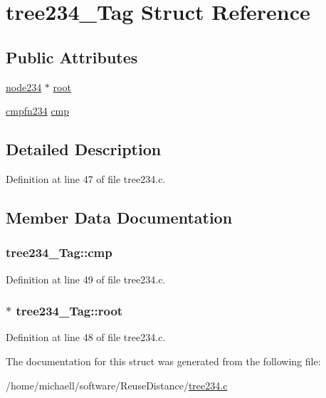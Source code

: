\hypertarget{structtree234___tag}{
\section{tree234\_\-Tag Struct Reference}
\label{structtree234___tag}
}
\subsection*{Public Attributes}
\begin{DoxyCompactItemize}
\item 
\hyperlink{structnode234___tag}{node234} $\ast$ \hyperlink{structtree234___tag_a87972e40a769f91133666daede8341de}{root}
\item 
\hyperlink{tree234_8h_a32238e41ac5ead4a5e514b72ef37e7e7}{cmpfn234} \hyperlink{structtree234___tag_af698511614690f116f9213d9fe4c6d8d}{cmp}
\end{DoxyCompactItemize}


\subsection{Detailed Description}


Definition at line 47 of file tree234.c.

\subsection{Member Data Documentation}
\hypertarget{structtree234___tag_af698511614690f116f9213d9fe4c6d8d}{
\subsubsection[{cmp}]{ {\bf tree234\_\-Tag::cmp}}}
\label{structtree234___tag_af698511614690f116f9213d9fe4c6d8d}


Definition at line 49 of file tree234.c.\hypertarget{structtree234___tag_a87972e40a769f91133666daede8341de}{
\subsubsection[{root}]{$\ast$ {\bf tree234\_\-Tag::root}}}
\label{structtree234___tag_a87972e40a769f91133666daede8341de}


Definition at line 48 of file tree234.c.

The documentation for this struct was generated from the following file:\begin{DoxyCompactItemize}
\item 
/home/michaell/software/ReuseDistance/\hyperlink{tree234_8c}{tree234.c}\end{DoxyCompactItemize}
